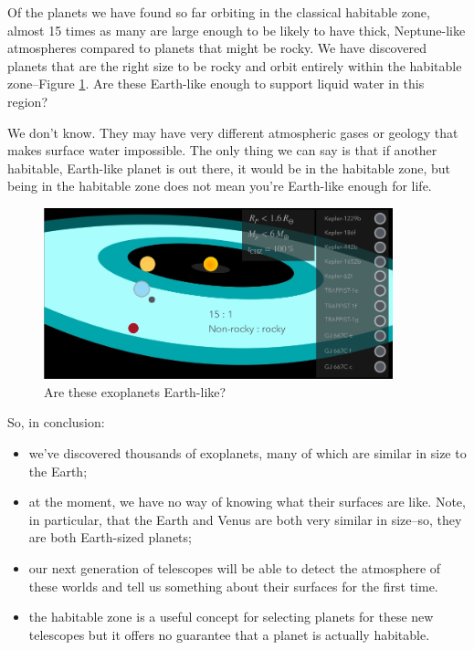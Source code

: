\documentclass[]{article}
\begin{document}
Of the planets we have found so far orbiting in the classical habitable zone, almost 15 times as many are large enough to be likely to have thick, Neptune-like atmospheres compared to planets that might be rocky.
We have discovered planets that are the right size to be rocky and orbit entirely within
the habitable zone--Figure \ref{fig:are:these:earthlike}.
Are these Earth-like enough to support liquid water in this region?



We don't know. They may have very different atmospheric gases or geology that makes
surface water impossible. The only thing we can say is that if another habitable,
Earth-like planet is out there, it would be in the habitable zone, but being in the habitable zone does not mean you're Earth-like enough for life.

\begin{figure}[H]
	\begin{center}
		\caption{Are these exoplanets Earth-like?}\label{fig:are:these:earthlike}
		\includegraphics[width=0.9\textwidth]{AreTheseEarthlike}
	\end{center}
\end{figure}

So, in conclusion:\begin{itemize}
	\item  we've discovered thousands of exoplanets, many of which are similar in size to the Earth; 
	\item at the moment, we have no way of knowing what their surfaces are like. Note, in particular, that the Earth and Venus are both very similar in size--so, they are both Earth-sized planets;
	\item our next generation of telescopes will be able to detect the atmosphere of these worlds and tell us something about their surfaces for the first time.
	
	\item the habitable zone is a useful concept for selecting planets for these new telescopes but it offers no guarantee that a planet is actually habitable.
\end{itemize}
\end{document}
